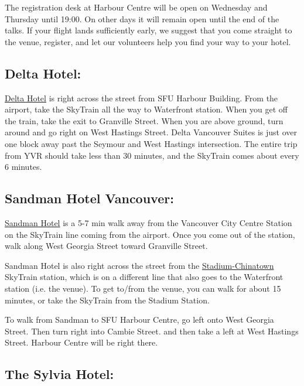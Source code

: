 \documentclass[letterpaper,12pt]{article}
\begin{document}
The registration desk at Harbour Centre will be open on Wednesday and Thursday until 19:00. On other days it will remain open until the end of the talks. If your flight lands sufficiently early, we suggest that you come straight to the venue, register, and let our volunteers help you find your way to your hotel. 

\subsection*{Delta Hotel:}

\href{http://www.marriott.com/hotels/travel/yvrdv-delta-vancouver-suites/}{Delta Hotel} is right across the street from SFU Harbour Building. From the airport, take the SkyTrain all the way to Waterfront station. When you get off the train, take the exit to Granville Street. When you are above ground, turn around and go right on West Hastings Street. Delta Vancouver Suites is just over one block away past the Seymour and West Hastings intersection. The entire trip from YVR should take less than 30 minutes, and the SkyTrain comes about every 6 minutes.

\subsection*{Sandman Hotel Vancouver:}
 
\href{https://www.sandmanhotels.com/locations/british-columbia/vancouver/hotels/vancouver-city-centre-vcc?property=VCC&adults=2&children=0&dates=2017-01-24_2017-01-29&groupCode=912299&fromSearch=1&currency=CAD}{Sandman Hotel} is a 5-7 min walk away from the Vancouver City Centre Station on the SkyTrain line coming from the airport. Once you come out of the station, walk along West Georgia Street toward Granville Street. 

Sandman Hotel is also right across the street from the \href{http://infomaps.translink.ca/System_Maps/skytrain_station_maps/stadium_chinatown_station.pdf}{Stadium-Chinatown} SkyTrain station, which is on a different line that also goes to the Waterfront station (i.e. the venue). To get to/from the venue, you can walk for about 15 minutes, or take the SkyTrain from the Stadium Station.

To walk from Sandman to SFU Harbour Centre, go left onto West Georgia Street. Then turn right into Cambie Street. and then take a left at West Hastings Street. Harbour Centre will be right there.


\subsection*{The Sylvia Hotel:}
\end{document}
